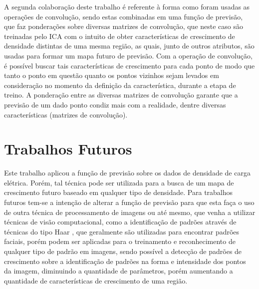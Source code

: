 A segunda colaboração deste trabalho é referente à forma como foram usadas as operações de convolução, sendo estas combinadas em uma função de previsão, que faz ponderações sobre diversas matrizes de convolução, que neste caso são treinadas pelo ICA com o intuito de obter características de crescimento de densidade distintas de uma mesma região, as quais, junto de outros atributos, são usadas para formar um mapa futuro de previsão. Com a operação de convolução, é possível buscar tais características de crescimento para cada ponto de modo que tanto o ponto em questão quanto os pontos vizinhos sejam levados em consideração no momento da definição da característica, durante a etapa de treino. A ponderação entre as diversas matrizes de convolução garante que a previsão de um dado ponto condiz mais com a realidade, dentre diversas características (matrizes de convolução).

\section{Trabalhos Futuros}
\label{trabalhos_futuros}

Este trabalho aplicou a função de previsão sobre os dados de densidade de carga elétrica. Porém, tal técnica pode ser utilizada para a busca de um mapa de crescimento futuro baseado em qualquer tipo de densidade. Para trabalhos futuros tem-se a intenção de alterar a função de previsão para que esta faça o uso de outra técnica de processamento de imagens ou até mesmo, que venha a utilizar técnicas de visão computacional, como a identificação de padrões através de técnicas do tipo Haar \cite{mita2005joint}, que geralmente são utilizadas para encontrar padrões faciais, porém podem ser aplicadas para o treinamento e reconhecimento de qualquer tipo de padrão em imagens, sendo possível a detecção de padrões de crescimento sobre a identificação de padrões na forma e intensidade dos pontos da imagem, diminuindo a quantidade de parâmetros, porém aumentando a quantidade de características de crescimento de uma região.


